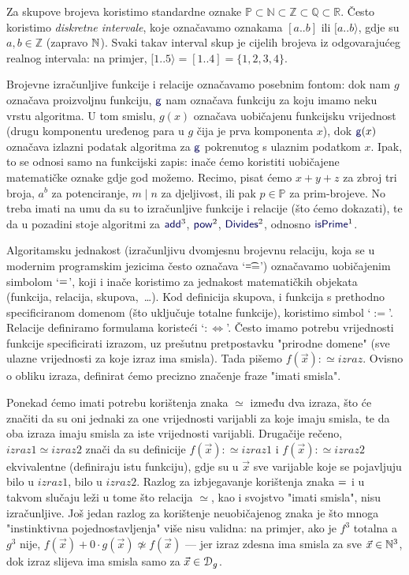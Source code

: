 Za skupove brojeva koristimo standardne oznake $\mathbb P\subset
\mathbb N\subset
\mathbb Z\subset
\mathbb Q\subset
\mathbb R$. Često koristimo \emph{diskretne intervale}, koje označavamo oznakama $[a..b]$ ili $[a..b\rangle$, gdje su $a,b\in\mathbb Z$ (zapravo ${\mathbb N}$). Svaki takav interval skup je cijelih brojeva iz odgovarajućeg realnog intervala: na primjer, $[1..5\rangle=[1..4]=\{1,2,3,4\}$.

Brojevne izračunljive funkcije i relacije označavamo posebnim fontom: dok nam $g$ označava proizvoljnu funkciju, $\f{g}$ nam označava funkciju za koju imamo neku vrstu algoritma. U tom smislu, $g(x)$ označava uobičajenu funkcijsku vrijednost (drugu komponentu uređenog para u $g$ čija je prva komponenta $x$), dok $\f{g}(x)$ označava izlazni podatak algoritma za $\f{g}$ pokrenutog s ulaznim podatkom $x$. Ipak, to se odnosi samo na funkcijski zapis: inače ćemo koristiti uobičajene matematičke oznake gdje god možemo. Recimo, pisat ćemo $x+y+z$ za zbroj tri broja, $a^b$ za potenciranje, $m\mid n$ za djeljivost, ili pak $p\in\mathbb P$ za prim-brojeve. No treba imati na umu da su to izračunljive funkcije i relacije (što ćemo dokazati), te da u pozadini stoje algoritmi za $\f{add}^3$, $\f{pow}^2$, $\f{Divides}^2$, odnosno $\f{isPrime}^1$.

\begin{napomena}[{name=[jednakost i parcijalna jednakost]}]\label{nap:parcdef}
Algoritamsku jednakost (izračunljivu dvomjesnu brojevnu relaciju, koja se u modernim programskim jezicima često označava `\t{==}') oz\-na\-ča\-va\-mo uobičajenim simbolom `$=$', koji i inače koristimo za jednakost matematičkih objekata (funkcija, relacija, skupova,~\ldots). Kod definicija skupova, i funkcija s prethodno specificiranom domenom (što uključuje totalne funkcije), koristimo simbol `$:=$'. Relacije definiramo formulama koristeći `$:\Longleftrightarrow$'. Često imamo potrebu vrijednosti funkcije specificirati izrazom, uz prešutnu pretpostavku "prirodne domene" (sve ulazne vrijednosti za koje izraz ima smisla). Tada pišemo $f(\vec x):\simeq izraz$. Ovisno o obliku izraza, definirat ćemo precizno značenje fraze "imati smisla".
\end{napomena}

Ponekad ćemo imati potrebu korištenja znaka $\simeq$ između dva izraza, što će značiti da su oni jednaki za one vrijednosti varijabli za koje imaju smisla, te da oba izraza imaju smisla za iste vrijednosti varijabli. Drugačije rečeno, $izraz1\simeq izraz2$ znači da su definicije $f(\vec x):\simeq izraz1$ i $f(\vec x):\simeq izraz2$ ekvivalentne (definiraju istu funkciju), gdje su u $\vec x$ sve varijable koje se pojavljuju bilo u $izraz1$, bilo u $izraz2$. Razlog za izbjegavanje korištenja znaka $=$ i u takvom slučaju leži u tome što relacija $\simeq$, kao i svojstvo "imati smisla", nisu izračunljive. Još jedan razlog za korištenje neuobičajenog znaka je što mnoga "instinktivna pojednostavljenja" više nisu validna: na primjer, ako je $f^3$ totalna a $g^3$ nije, $f(\vec x)+0\cdot g(\vec x)\not\simeq f(\vec x)$ --- jer izraz zdesna ima smisla za sve $\vec x\in{\mathbb N}^3$, dok izraz slijeva ima smisla samo za $\vec x\in\mathcal D_{g}$.


